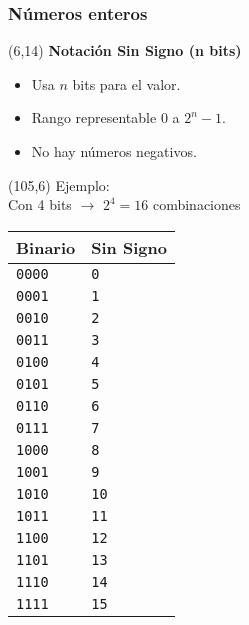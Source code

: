 \documentclass[aspectratio=169]{beamer}
\begin{document}
\begin{frame}[fragile]
    \frametitle{Números enteros}
    \begin{textblock}{90}(6,14)
    \textbf{Notación Sin Signo (n bits)}
    \begin{itemize}
    \item Usa $n$ bits para el valor.
    \item Rango representable $0$ a $2^n-1$.
    \item No hay números negativos.
    \end{itemize}
    \vspace{0.5cm}
    \end{textblock}

    \begin{textblock}{90}(105,6)
        Ejemplo:\\
        \footnotesize Con 4 bits $\rightarrow$ $2^4 = 16$ combinaciones\\
        \bigskip
        \footnotesize
        \begin{tabular}{|p{1cm}|p{2.5cm}|}
        \hline
        Binario        & Sin Signo    \\ \hline
        \texttt{0000}  & \texttt{0}   \\ 
        \texttt{0001}  & \texttt{1}   \\
        \texttt{0010}  & \texttt{2}   \\ 
        \texttt{0011}  & \texttt{3}   \\
        \texttt{0100}  & \texttt{4}   \\ 
        \texttt{0101}  & \texttt{5}   \\ 
        \texttt{0110}  & \texttt{6}   \\ 
        \texttt{0111}  & \texttt{7}   \\
        \texttt{1000}  & \texttt{8}   \\ 
        \texttt{1001}  & \texttt{9}   \\ 
        \texttt{1010}  & \texttt{10}  \\ 
        \texttt{1011}  & \texttt{11}  \\ 
        \texttt{1100}  & \texttt{12}  \\ 
        \texttt{1101}  & \texttt{13}  \\ 
        \texttt{1110}  & \texttt{14}  \\ 
        \texttt{1111}  & \texttt{15}  \\ \hline
        \end{tabular}
    \end{textblock}
    
\end{frame}
\end{document}
